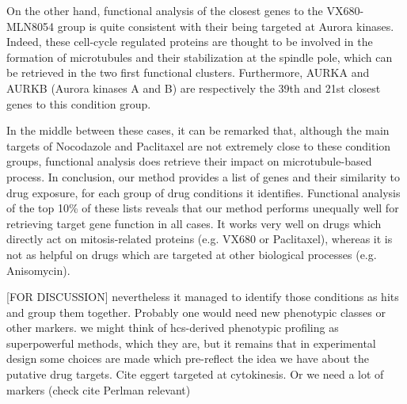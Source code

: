 On the other hand, functional analysis of the closest genes to the VX680-MLN8054 group is quite consistent with their being targeted at Aurora kinases. Indeed, these cell-cycle regulated proteins are thought to be involved in the formation of microtubules and their stabilization at the spindle pole, which can be retrieved in the two first functional clusters. Furthermore, AURKA and AURKB (Aurora kinases A and B) are respectively the 39th and 21st closest genes to this condition group. %

In the middle between these cases, it can be remarked that, although the main targets of Nocodazole and Paclitaxel are not extremely close to these condition groups, functional analysis does retrieve their impact on microtubule-based process. In conclusion, our method provides a list of genes and their similarity to drug exposure, for each group of drug conditions it identifies. Functional analysis of the top 10\% of these lists reveals that our method performs unequally well for retrieving target gene function in all cases. It works very well on drugs which directly act on mitosis-related proteins (e.g. VX680 or Paclitaxel), whereas it is not as helpful on drugs which are targeted at other biological processes (e.g. Anisomycin). 

[FOR DISCUSSION]
nevertheless it managed to identify those conditions as hits and group them together. Probably one would need new phenotypic classes or other markers. we might think of hcs-derived phenotypic profiling as superpowerful methods, which they are, but it remains that in experimental design some choices are made which pre-reflect the idea we have about the putative drug targets. Cite eggert targeted at cytokinesis. Or we need a lot of markers (check cite Perlman relevant)


